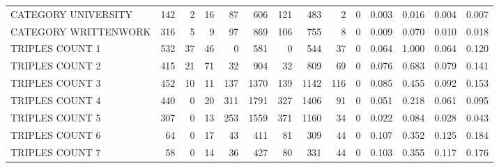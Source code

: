 \begin{tabular}{lrrrrrrrrrllll}
 CATEGORY UNIVERSITY      &             142 &             2 &              16 &              87 &             606 &  121 &  483 &    2 &    0 & 0.003 & 0.016 & 0.004 & 0.007 \\
 CATEGORY WRITTENWORK     &             316 &             5 &               9 &              97 &             869 &  106 &  755 &    8 &    0 & 0.009 & 0.070 & 0.010 & 0.018 \\
 TRIPLES COUNT 1          &             532 &            37 &              46 &               0 &             581 &    0 &  544 &   37 &    0 & 0.064 & 1.000 & 0.064 & 0.120 \\
 TRIPLES COUNT 2          &             415 &            21 &              71 &              32 &             904 &   32 &  809 &   69 &    0 & 0.076 & 0.683 & 0.079 & 0.141 \\
 TRIPLES COUNT 3          &             452 &            10 &              11 &             137 &            1370 &  139 & 1142 &  116 &    0 & 0.085 & 0.455 & 0.092 & 0.153 \\
 TRIPLES COUNT 4          &             440 &             0 &              20 &             311 &            1791 &  327 & 1406 &   91 &    0 & 0.051 & 0.218 & 0.061 & 0.095 \\
 TRIPLES COUNT 5          &             307 &             0 &              13 &             253 &            1559 &  371 & 1160 &   34 &    0 & 0.022 & 0.084 & 0.028 & 0.043 \\
 TRIPLES COUNT 6          &              64 &             0 &              17 &              43 &             411 &   81 &  309 &   44 &    0 & 0.107 & 0.352 & 0.125 & 0.184 \\
 TRIPLES COUNT 7          &              58 &             0 &              14 &              36 &             427 &   80 &  331 &   44 &    0 & 0.103 & 0.355 & 0.117 & 0.176 \\
\hline
\end{tabular}